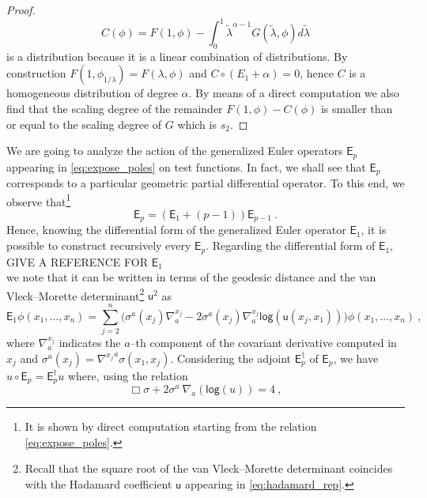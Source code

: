 \documentclass[11pt]{book}
\newcommand{\hilight}[1]{\colorbox{yellow!80!black}{#1}}
\renewcommand{\log}{\mathsf{log}}
\newcommand{\Esf}{\mathsf{E}}
\newcommand{\usf}{\mathsf{u}}
\theoremstyle{break}
\begin{document}
\begin{proof}
%
\begin{equation*}
C(\phi) = F(1,\phi) - \int_0^1  \tilde{\lambda}^{\alpha-1} G(\tilde{\lambda},\phi) d\tilde{\lambda} 
\end{equation*}
%
is a distribution because it is a linear combination of distributions. By construction $F(1,\phi_{1/\lambda})=F(\lambda,\phi)$ and $C\circ (E_1+\alpha) =0$, hence $C$ is a homogeneous distribution of degree $\alpha$. By means of a direct computation we also find that the scaling degree of the remainder $F(1,\phi)-C(\phi)$ is smaller than or equal to the scaling degree of $G$ which is $s_2$.
\end{proof}



We are going to analyze the action of the generalized Euler operators $\Esf_p$ appearing in \eqref{eq:expose_poles} on test functions. In fact, we shall see that $\Esf_p$ corresponds to a particular geometric partial differential operator. To this end, we observe that\footnote{It is shown by direct computation starting from the relation \eqref{eq:expose_poles}.}
%
\begin{equation*}
\Esf_p = (\Esf_1 + (p-1)) \Esf_{p-1} \ . 
\end{equation*}
%
Hence, knowing the differential form of the generalized Euler operator $\Esf_1$, it is possible to construct recursively every $\Esf_p$. Regarding the differential form of $\Esf_1$,\\
\hilight{GIVE A REFERENCE FOR $\Esf_1$}\\
we note that it can be written in terms of the geodesic distance and the van Vleck--Morette determinant\footnote{Recall that the square root of the van Vleck--Morette determinant coincides with the Hadamard coefficient $\usf$ appearing in \eqref{eq:hadamard_rep}.} $\usf^2$  as
%
\begin{equation*}
\Esf_1 \phi(x_1 , \dots , x_n) = \sum_{j=2}^n \bigg( \sigma^a(x_j) \nabla^{x_j}_a  - 2  \sigma^a(x_j) \nabla^{x_j}_a  \log\left(\usf(x_j,x_1)\right) \bigg) \phi(x_1 , \dots , x_n) \ , 
\end{equation*}
%
where $\nabla^{x_j}_a$ indicates the $a$--th component of the covariant derivative computed in $x_j$ and $\sigma^a(x_j) = {\nabla^{x_j}}^a \sigma(x_1,x_j)$. Considering the adjoint $\Esf^\dagger_p$ of $\Esf_p$, we have $u \circ \Esf_p = \Esf^\dagger_p u$ where, using the relation
\begin{equation*}
\Box \sigma + 2 \sigma^a \ \nabla_a\left( \log (u) \right) = 4 \ , 
\end{equation*}
\end{document}
